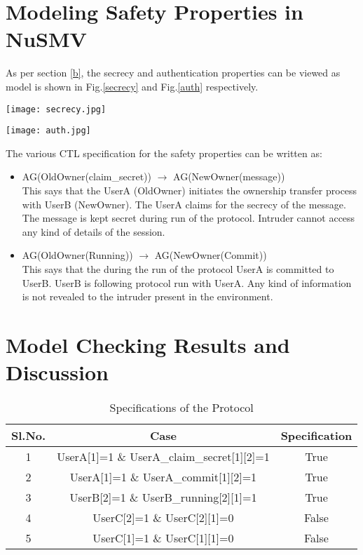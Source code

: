 \documentclass[letterpaper]{article}
\begin{document}
\section{Modeling Safety Properties in NuSMV}
\label{e}
As per section \ref{b}, the secrecy and authentication properties can be viewed as model is shown in Fig.\ref{secrecy} and Fig.\ref{auth} respectively.
\begin{figure*}[bpht!]
	\centering
		\texttt{[image: secrecy.jpg]}
	\caption{Model Showing a Secrecy Claim.}
	\label{secrecy}
\end{figure*}


\begin{figure*}[bpht!]
	\centering
		\texttt{[image: auth.jpg]}
	\caption{Model Showing an Authentication Claim.}
	\label{auth}
\end{figure*}


The various CTL specification for the safety properties can be written as:
\begin{itemize}
	\item AG(OldOwner(claim\_secret)) $\rightarrow$ AG(NewOwner(message))\\
	This says that the UserA (OldOwner) initiates the ownership transfer process with UserB (NewOwner). The UserA claims for the secrecy of the message. The message is kept secret during run of the protocol. Intruder cannot access any kind of details of the session.\\
	\item AG(OldOwner(Running)) $\rightarrow$ AG(NewOwner(Commit))\\
	This says that the during the run of the protocol UserA is committed to UserB. UserB is following protocol run with UserA. Any kind of information is not revealed to the intruder present in the environment.\\
	\end{itemize}
	
\section{Model Checking Results and Discussion}	
\label{f}

\begin{table}[bpht!]
\centering
\caption{Specifications of the Protocol}
	\label{tab:1}
		\begin{tabular}{|c|c|c|}
		\hline
			Sl.No. & Case & Specification\\
			\hline
			1 & UserA[1]=1 \& UserA\_claim\_secret[1][2]=1 & True\\
			\hline
			2 & UserA[1]=1 \& UserA\_commit[1][2]=1 & True\\
			\hline
			3 & UserB[2]=1 \& UserB\_running[2][1]=1 & True\\
			\hline
			4 & UserC[2]=1 \& UserC[2][1]=0 & False\\
			\hline
			5 & UserC[1]=1 \& UserC[1][1]=0 & False\\
			\hline
			\end{tabular}
	\end{table}
\end{document}
